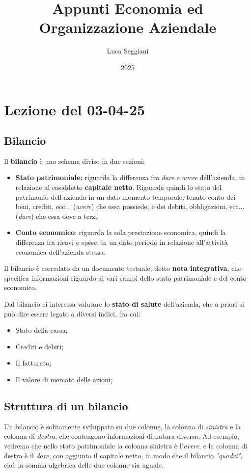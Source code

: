 \documentclass[a4paper,11pt]{article}
\title{Appunti Economia ed Organizzazione Aziendale}
\author{Luca Seggiani}
\date{2025}
\begin{document}
\section{Lezione del 03-04-25}

\thispagestyle{empty}
\pagestyle{fancy}

\subsection{Bilancio}
Il \textbf{bilancio} è uno schema diviso in due sezioni:
\begin{itemize}
	\item \textbf{Stato patrimoniale:} riguarda la differenza fra \textit{dare} e \textit{avere} dell'azienda, in relazione al cosiddetto \textbf{capitale netto}.
		Riguarda quindi lo stato del patrimonio dell azienda in un dato momento temporale, tenuto conto dei beni, crediti, ecc... (\textit{avere}) che essa possiede, e dei debiti, obbligazioni, ecc... (\textit{dare}) che essa deve a terzi;
	\item \textbf{Conto economico}: riguarda la sola prestazione economica, quindi la differenza fra ricavi e spese, in un dato periodo in relazione all'attività economica dell'azienda stessa.
\end{itemize}
Il bilancio è corredato da un documento testuale, detto \textbf{nota integrativa}, che specifica informazioni riguardo ai vari campi dello stato patrimoniale e del conto economico.

Dal bilancio ci interessa valutare lo \textbf{stato di salute} dell'azienda, che a priori si può dire essere legato a diversi indici, fra cui:
\begin{itemize}
	\item Stato della cassa;
	\item Crediti e debiti;
	\item Il fatturato;
	\item Il valore di mercato delle azioni; 
\end{itemize}

\subsection{Struttura di un bilancio}
Un bilancio è solitamente sviluppato su due colonne, la colonna di \textit{sinistra} e la colonna di \textit{destra}, che contengono informazioni di natura diversa.
Ad esempio, vedremo che nello stato patrimoniale la colonna sinistra è l'\textit{avere}, e la colonna di destra è il \textit{dare}, con aggiunto il capitale netto, in modo che il bilancio \textit{"quadri"}, cioè la somma algebrica delle due colonne sia uguale.
\end{document}
